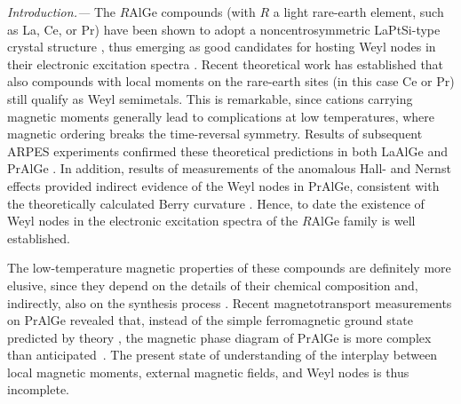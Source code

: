 \documentclass[aps,prb,a4paper,10pt,twocolumn,showpacs,floatfix,superscriptaddress,preprintnumbers,longbibliography]{revtex4-2}
\begin{document}
%
\emph{Introduction.---} The $R$AlGe compounds (with $R$ a light rare-earth element, such as La, 
Ce, or Pr) have been shown to adopt a noncentrosymmetric LaPtSi-type 
crystal structure \cite{Gladyshevskii2000}, thus emerging %
as good candidates for hosting Weyl nodes in their electronic excitation 
spectra \cite{Armitage2018}. Recent theoretical work \cite{chang2018magnetic} 
has established that also compounds with local moments on the rare-earth
sites (in this case Ce or Pr) still qualify as Weyl semimetals.
This is remarkable, since cations carrying magnetic moments generally
lead to complications at low temperatures, where magnetic ordering
breaks the time-reversal symmetry.
Results of subsequent ARPES experiments confirmed these theoretical
predictions in both LaAlGe \cite{xue2017discovery} and PrAlGe
\cite{sanchez2020observation}. 
In addition, results of measurements of the anomalous Hall- and Nernst 
effects \cite{destraz2020magnetism} provided indirect evidence of the 
Weyl nodes in PrAlGe, consistent with the theoretically calculated 
Berry curvature %
\cite{destraz2020magnetism}. Hence, to date the existence of Weyl
nodes in the electronic excitation spectra of the $R$AlGe family
is well established.

The low-temperature magnetic properties of these compounds are
definitely more elusive, since they depend on the details of their
chemical composition and, indirectly, also on the synthesis
process \cite{puphal2019bulk}. 
Recent magnetotransport measurements on PrAlGe revealed that, 
instead of the simple ferromagnetic ground state predicted by theory
\cite{chang2018magnetic}, 
the magnetic phase diagram of PrAlGe is more complex than 
anticipated~\cite{destraz2020magnetism}. The present state of 
understanding of the interplay between local magnetic moments,
external magnetic fields, and Weyl nodes is thus incomplete.  
\end{document}
